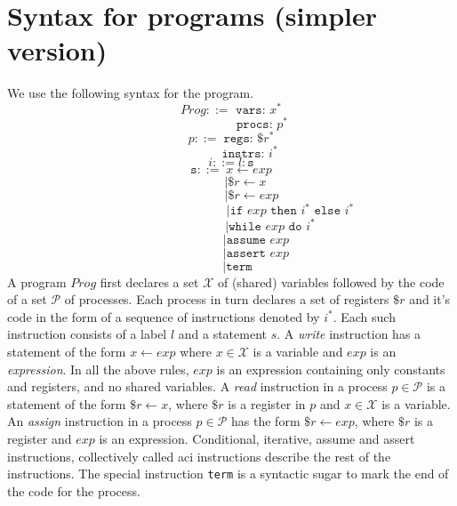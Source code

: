 \documentclass{article}
\begin{document}
\section{Syntax for programs (simpler version)}
We use the following syntax for the program.
$$Prog ::= \texttt{ vars: }x^*$$
\vspace{-2em}
$$\qquad\qquad\quad\texttt{procs: }p^*$$
$$p ::= \;\texttt{regs: } \$r^*$$
\vspace{-2em}
$$\qquad\quad\texttt{instrs: }i^*$$
$$i ::= l:\texttt{s}$$
$$\texttt{s} ::= \;x \leftarrow exp$$ 
\vspace{-1.7em}
$$\qquad\;| \$r \leftarrow x $$
\vspace{-1.7em}
$$\qquad\quad\;| \$r \leftarrow exp$$
\vspace{-1.7em}
$$\qquad\qquad\qquad\qquad\quad\enspace|\texttt{if } exp \texttt{ then }i^* \texttt{ else }i^*$$
\vspace{-1.7em}
$$\qquad\qquad\qquad\;|\texttt{while } exp \texttt{ do }i^*$$
\vspace{-1.7em}
$$\qquad\qquad|\texttt{assume } exp$$
\vspace{-1.7em}
$$\qquad\qquad|\texttt{assert } exp$$
\vspace{-1.7em}
$$\quad|\texttt{term}$$
A program $Prog$ first declares a set $\mathcal{X}$ of (shared) variables followed by the code of a set $\mathcal{P}$ of processes. Each process in turn declares a set of registers $\$r$ and it's code in the form of a sequence of instructions denoted by $i^*$. Each such instruction consists of a label $l$ and a statement $s$. A \textit{write} instruction has a statement of the form $x \leftarrow exp$ where $x \in \mathcal{X}$ is a variable and $exp$ is an \textit{expression}. In all the above rules, $exp$ is an expression containing only constants and registers, and no shared variables. A \textit{read} instruction in a process $p \in \mathcal{P}$ is a statement of the form $\$r \leftarrow x$, where $\$r$ is a register in $p$ and $x \in \mathcal{X}$ is a variable. An \textit{assign} instruction in a process $p \in \mathcal{P}$ has the form $\$r \leftarrow exp$, where $\$r$ is a register and $exp$ is an expression. Conditional, iterative, assume and assert instructions, collectively called aci instructions describe the rest of the instructions. The special instruction \texttt{term} is a syntactic sugar to mark the end of the code for the process.
\vspace{-1em}
\end{document}
